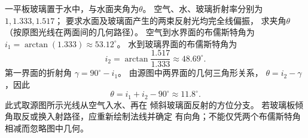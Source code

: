\problemtext 一平板玻璃置于水中，与水面夹角为$\theta$。
空气、水、玻璃折射率分别为$1,1.333,1.517$；
要求水面及玻璃面产生的两束反射光均完全线偏振，
求夹角$\theta$（按原图光线在两面间的几何路径）。
\workings
空气到水界面的布儒斯特角为
$i_1=\arctan(1.333)\approx53.12^\circ$。
水到玻璃界面的布儒斯特角为
\[
 i_2=\arctan\frac{1.517}{1.333}\approx48.69^\circ.
\]
第一界面的折射角
$\gamma=90^\circ-i_1$。
由源图中两界面的几何三角形关系，
$\theta=i_2-\gamma$，因此
\[
 \boxed{\theta=i_1+i_2-90^\circ\approx11.8^\circ}.
\]
\crosscheck 此式取源图所示光线从空气入水、再在
倾斜玻璃面反射的方位分支。
若玻璃板倾角取反或换入射路径，应重新绘制法线并确定
有向角；不能仅凭两个布儒斯特角相减而忽略图中几何。
